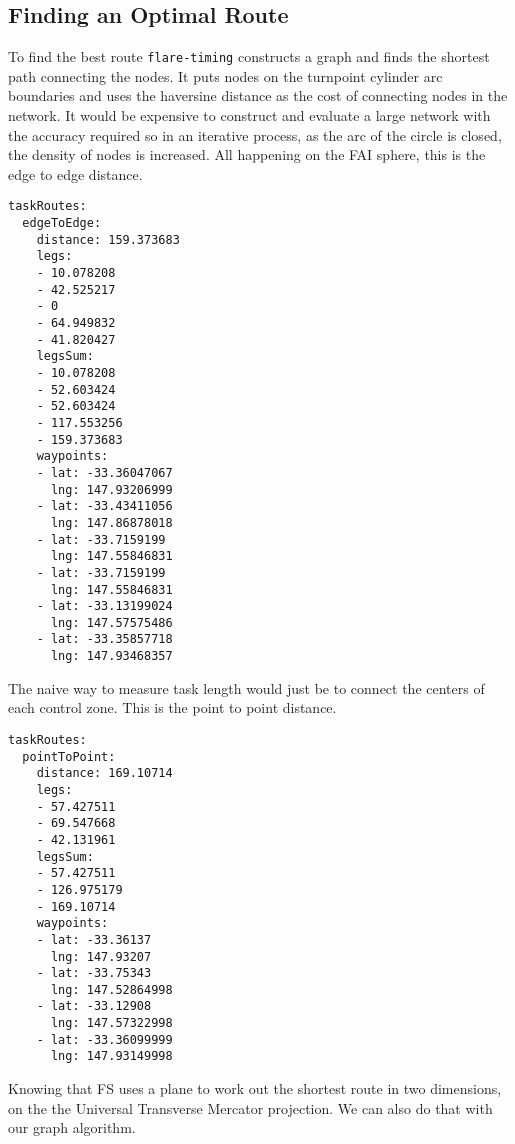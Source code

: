 \documentclass[gap.tex]{subfiles}
\begin{document}
\newpage
\subsection{Finding an Optimal Route}

To find the best route \texttt{flare-timing} constructs a graph and finds the
shortest path connecting the nodes. It puts nodes on the turnpoint cylinder arc
boundaries and uses the haversine distance as the cost of connecting nodes in
the network. It would be expensive to construct and evaluate a large network
with the accuracy required so in an iterative process, as the arc of the circle
is closed, the density of nodes is increased. All happening on the FAI sphere,
this is the edge to edge distance.

\begin{lstlisting}[caption={Edge to edge distance of the optimal route, \texttt{edgeToEdge} node of \texttt{*.task-length.yaml}.}]
taskRoutes:
  edgeToEdge:
    distance: 159.373683
    legs:
    - 10.078208
    - 42.525217
    - 0
    - 64.949832
    - 41.820427
    legsSum:
    - 10.078208
    - 52.603424
    - 52.603424
    - 117.553256
    - 159.373683
    waypoints:
    - lat: -33.36047067
      lng: 147.93206999
    - lat: -33.43411056
      lng: 147.86878018
    - lat: -33.7159199
      lng: 147.55846831
    - lat: -33.7159199
      lng: 147.55846831
    - lat: -33.13199024
      lng: 147.57575486
    - lat: -33.35857718
      lng: 147.93468357
\end{lstlisting}

The naive way to measure task length would just be to connect the centers of each control zone. This is the point to point distance.

\begin{lstlisting}[caption={Which fixes are considered flown, \texttt{flying}
nodes of \texttt{*.task-length.yaml}.}]
taskRoutes:
  pointToPoint:
    distance: 169.10714
    legs:
    - 57.427511
    - 69.547668
    - 42.131961
    legsSum:
    - 57.427511
    - 126.975179
    - 169.10714
    waypoints:
    - lat: -33.36137
      lng: 147.93207
    - lat: -33.75343
      lng: 147.52864998
    - lat: -33.12908
      lng: 147.57322998
    - lat: -33.36099999
      lng: 147.93149998
\end{lstlisting}

Knowing that FS uses a plane to work out the shortest route in two dimensions,
on the the Universal Transverse Mercator projection.  We can also do that with
our graph algorithm.
\end{document}
